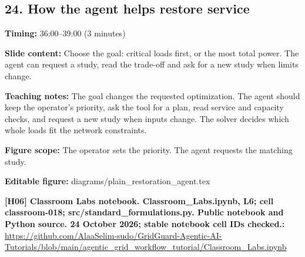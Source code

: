 \documentclass[10pt,letterpaper]{article}
\begin{document}
\subsection*{24. How the agent helps restore service}
\textbf{Timing:} 36:00--39:00 (3 minutes)\par
\textbf{Slide content:} Choose the goal: critical loads first, or the most total power.
The agent can request a study, read the trade-off and ask for a new study when limits change.\par
\textbf{Teaching notes:} The goal changes the requested optimization. The agent should keep the operator's priority, ask the tool for a plan, read service and capacity checks, and request a new study when inputs change. The solver decides which whole loads fit the network constraints.\par
\textbf{Figure scope:} The operator sets the priority. The agent requests the matching study.\par
\textbf{Editable figure:} diagrams/plain\_restoration\_agent.tex\par
\textbf{[H06] Classroom Labs notebook. Classroom\_Labs.ipynb, L6; cell classroom-018; src/standard\_formulations.py. Public notebook and Python source. 24 October 2026; stable notebook cell IDs checked.:} \href{https://github.com/AlaaSelim-sudo/GridGuard-Agentic-AI-Tutorials/blob/main/agentic_grid_workflow_tutorial/Classroom_Labs.ipynb}{\small\ttfamily https:/\allowbreak{}/\allowbreak{}github.\allowbreak{}com/\allowbreak{}AlaaSelim-\allowbreak{}sudo/\allowbreak{}GridGuard-\allowbreak{}Agentic-\allowbreak{}AI-\allowbreak{}Tutorials/\allowbreak{}blob/\allowbreak{}main/\allowbreak{}agentic\_\allowbreak{}grid\_\allowbreak{}workflow\_\allowbreak{}tutorial/\allowbreak{}Classroom\_\allowbreak{}Labs.\allowbreak{}ipynb}\par
\par\medskip
\end{document}
